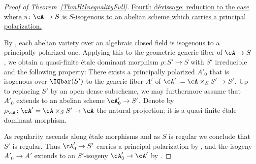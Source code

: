 \begin{proof}[Proof of Theorem~\ref{ThmHtInequalityFull}]
\ul{Fourth d\'{e}vissage: reduction to the case where $\pi \colon \cA \rightarrow S$ is $S$-isogenous to an abelian scheme which carries a principal polarization.}


By \cite[$\mathsection$23,
Corollary~1]{MumfordAbVar}, each abelian variety over an algebraic
closed field is isogenous to a principally polarized one. Applying
this to the geometric generic fiber of $\cA \rightarrow S$, we obtain a
quasi-finite \'{e}tale dominant morphism
 $\rho \colon S' \rightarrow S$ with $S'$ irreducible and the
 following property: There exists a principally polarized $A'_0$ that
 is isogenous over $\IQbar(S')$ to  the
 generic fiber $A'$ of $\cA':= \cA\times_{S} S' \rightarrow S'$.
 Up to replacing $S'$ by an open dense subscheme, we may furthermore assume that $A'_0$ extends to an abelian scheme $\cA'_0 \rightarrow S'$.
 Denote by $\rho_{\cA} \colon \cA' =\cA \times_S S' \rightarrow \cA$ the natural projection; it is a quasi-finite \'{e}tale dominant morphism.

As regularity ascends along \'etale morphisms and as $S$ is regular we conclude that $S'$ is regular. Thus $\cA'_0 \rightarrow S'$ carries a principal polarization by \cite[Th\'{e}or\`{e}me~XI~1.4]{LNM119}, and the isogeny $A'_0 \rightarrow A'$ extends to an $S'$-isogeny $\cA'_0 \rightarrow \cA'$ by \cite[Lemme~XI~1.15]{LNM119}.%



\end{proof}
